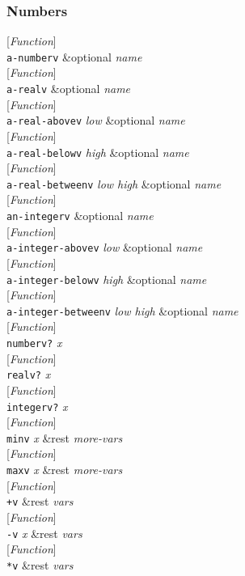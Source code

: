 \documentclass[10pt]{book}
\newenvironment{defother}[2]{[\textit{#1}]\\\texttt{#2}}{\\}
\newenvironment{defun}[1]{\begin{defother}{Function}{#1}}{\end{defother}}
\begin{document}
\subsubsection{Numbers}
\begin{defun}{a-numberv} \&optional \textit{name}\end{defun}
\begin{defun}{a-realv} \&optional \textit{name}\end{defun}
\begin{defun}{a-real-abovev} \textit{low} \&optional \textit{name}\end{defun}
\begin{defun}{a-real-belowv} \textit{high} \&optional \textit{name}\end{defun}
\begin{defun}{a-real-betweenv} \textit{low high} \&optional \textit{name}\end{defun}
\begin{defun}{an-integerv} \&optional \textit{name}\end{defun}
\begin{defun}{a-integer-abovev} \textit{low} \&optional \textit{name}\end{defun}
\begin{defun}{a-integer-belowv} \textit{high} \&optional \textit{name}\end{defun}
\begin{defun}{a-integer-betweenv} \textit{low high} \&optional \textit{name}\end{defun}
\begin{defun}{numberv?} \textit{x}\end{defun} %
\begin{defun}{realv?} \textit{x}\end{defun}
\begin{defun}{integerv?} \textit{x}\end{defun}
\begin{defun}{minv} \textit{x} \&rest \textit{more-vars}\end{defun}
\begin{defun}{maxv} \textit{x} \&rest \textit{more-vars}\end{defun}
\begin{defun}{+v} \&rest \textit{vars}\end{defun}
\begin{defun}{-v} \textit{x} \&rest \textit{vars}\end{defun}
\begin{defun}{*v} \&rest \textit{vars}\end{defun}
\end{document}
